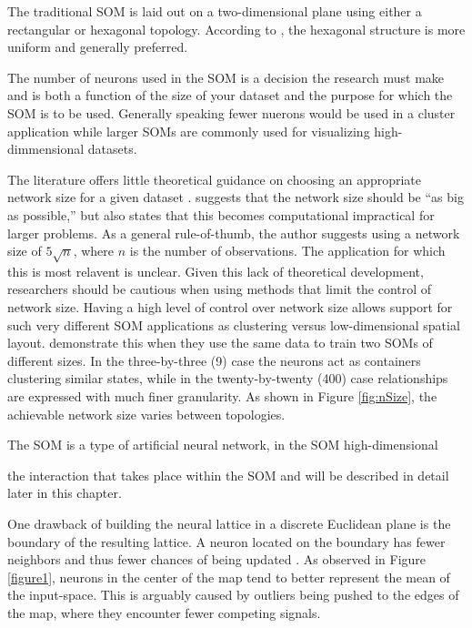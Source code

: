 The
traditional SOM is laid out on a two-dimensional plane using either a
rectangular or hexagonal topology.  According to \cite{wu2006}, the hexagonal
structure is more uniform and generally preferred.



The number of neurons used in the SOM is a decision the research must make and
is both a function of the size of your dataset and the purpose for which the
SOM is to be used.  Generally speaking fewer nuerons would be used in a
cluster application while larger SOMs are commonly used for visualizing
high-dimmensional datasets.


The literature offers little theoretical guidance
on choosing an appropriate network size for a given dataset \citep{cho1996}.
\cite{toolbox} suggests that the network size should be ``as big as
possible,'' but also states that this becomes computational impractical for
larger problems. As a general rule-of-thumb, the author suggests using a
network size of \(5\sqrt {n}\), where \(n\) is the number of observations. The
application for which this is most relavent is unclear.  Given this lack of
theoretical development, researchers should be cautious when using methods
that limit the control of network size.  Having a high level of control over
network size allows support for such very different SOM applications as
clustering versus low-dimensional spatial layout.  \cite{skupin08} demonstrate
this when they use the same data to train two SOMs of different sizes.  In the
three-by-three (9) case the neurons act as containers clustering similar
states, while in the twenty-by-twenty (400) case relationships are expressed
with much finer granularity.  As shown in Figure \ref{fig:nSize}, the
achievable network size varies between topologies.



The SOM is a type of artificial neural network, in the SOM high-dimensional


 the interaction that takes place within the SOM and will
be described in detail later in this chapter.  


One drawback of building the neural lattice in a discrete Euclidean plane is the
boundary of the resulting lattice.  A neuron located on the boundary has fewer
neighbors and thus fewer chances of being updated \citep{wu2006}.  As observed
in Figure \ref{figure1}, neurons in the center of the map tend to better
represent the mean of the input-space.  This is arguably caused by outliers
being pushed to the edges of the map, where they encounter fewer competing
signals.


